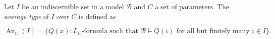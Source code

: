 Let $I$ be an indiscernible set in a model $\mathcal{B}$ and $C$ a set of parameters. The \textit{average type} of $I$ over $C$ is defined as

$$\operatorname{Av}_C(I) = \{Q(x) : L_C\text{-formula such that } \mathcal{B} \models Q(i) \text{ for all but finitely many } i \in I\}.$$
